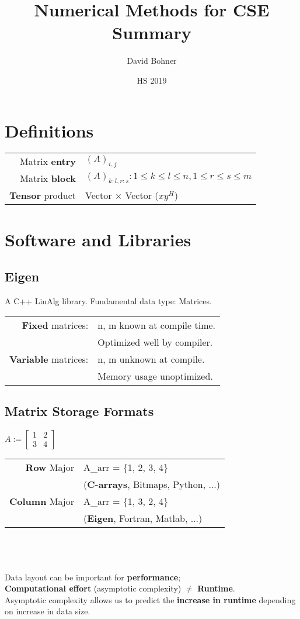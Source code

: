 \documentclass[12pt,a4paper]{article}
\author{David Bohner}
\title{Numerical Methods for CSE \\ Summary}
\date{HS 2019}
\begin{document}
\maketitle
\tableofcontents
\newpage
\section{Definitions}
\begin{tabularx}{\linewidth}{r X}
Matrix \textbf{entry} & $(A)_{i,j}$\\
Matrix \textbf{block} & $(A)_{k:l,r:s}: 1 \leq k \leq l \leq n, 1 \leq r \leq s \leq m$\\
\textbf{Tensor} product & Vector $\times$ Vector ($xy^H$)
\end{tabularx}

\section{Software and Libraries}
\subsection{Eigen}
A C++ LinAlg library. Fundamental data type: Matrices.\\

\begin{tabularx}{\linewidth}{r X}
\textbf{Fixed} matrices: & n, m known at compile time.\\ & Optimized well by compiler.\\
\textbf{Variable} matrices: & n, m unknown at compile.\\ & Memory usage unoptimized.
\end{tabularx}

\subsection{Matrix Storage Formats}
$A := \begin{bmatrix} 1 & 2 \\ 3 & 4 \end{bmatrix}$ \\
\begin{tabularx}{\linewidth}{r X}
\textbf{Row} Major & A\_arr = \{1, 2, 3, 4\}\\
& (\textbf{C-arrays}, Bitmaps, Python, ...)\\
\textbf{Column} Major & A\_arr = \{1, 3, 2, 4\}\\
& (\textbf{Eigen}, Fortran, Matlab, ...)
\end{tabularx}\\\\\\
Data layout can be important for \textbf{performance};\\
\textbf{Computational effort} (asymptotic complexity) $\neq$ \textbf{Runtime}.\\
Asymptotic complexity allows us to predict the \textbf{increase in runtime} depending on increase in data size.
\end{document}
